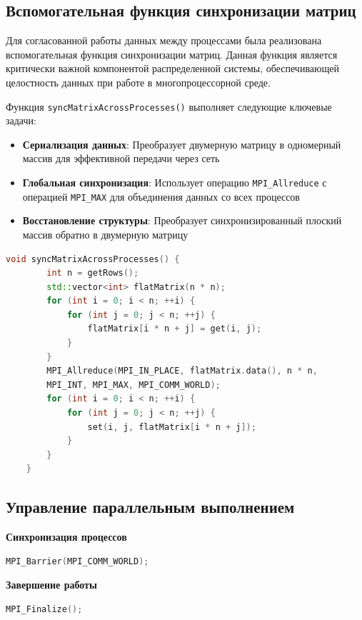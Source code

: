 \documentclass[11pt,a4paper,final]{article}
\begin{document}
\subsection{Вспомогательная функция синхронизации матриц}

Для  согласованной работы данных между процессами была реализована вспомогательная функция синхронизации матриц. Данная функция является критически важной компонентой распределенной системы, обеспечивающей целостность данных при работе в многопроцессорной среде. 
\par Функция \texttt{syncMatrixAcrossProcesses()} выполняет следующие ключевые задачи:

\begin{itemize}
	\item \textbf{Сериализация данных}: Преобразует двумерную матрицу в одномерный массив для эффективной передачи через сеть
	\item \textbf{Глобальная синхронизация}: Использует операцию \texttt{MPI\_Allreduce} с операцией \texttt{MPI\_MAX} для объединения данных со всех процессов
	\item \textbf{Восстановление структуры}: Преобразует синхронизированный плоский массив обратно в двумерную матрицу
\end{itemize}

\begin{lstlisting}[caption=Функция синхронизации матриц между процессами, label=lst:matrix_sync, language=C++]
	void syncMatrixAcrossProcesses() {
		int n = getRows();
		std::vector<int> flatMatrix(n * n);
		for (int i = 0; i < n; ++i) {
			for (int j = 0; j < n; ++j) {
				flatMatrix[i * n + j] = get(i, j);
			}
		}
		MPI_Allreduce(MPI_IN_PLACE, flatMatrix.data(), n * n, 
		MPI_INT, MPI_MAX, MPI_COMM_WORLD);
		for (int i = 0; i < n; ++i) {
			for (int j = 0; j < n; ++j) {
				set(i, j, flatMatrix[i * n + j]);
			}
		}
	}
\end{lstlisting}

\subsection{Управление параллельным выполнением}

\textbf{Синхронизация процессов}
\begin{lstlisting}[caption=Барьерная синхронизация процессов, label=lst:mpi_barrier, language=C++]
	MPI_Barrier(MPI_COMM_WORLD);
\end{lstlisting}

\textbf{Завершение работы}
\begin{lstlisting}[caption=Корректное завершение MPI, label=lst:mpi_finalize, language=C++]
	MPI_Finalize();
\end{lstlisting}
\end{document}
